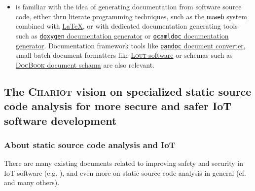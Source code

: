 \begin{itemize}
      \item is familiar with the idea of generating documentation from
        software source code, either thru
        \href{https://en.wikipedia.org/wiki/Literate_programming}{literate
          programming} techniques, such as the
           
        \href{http://nuweb.sourceforge.net/}{\texttt{nuweb} system}
        combined with \href{https://www.latex-project.org/}{\LaTeX},
        or with dedicated documentation generating tools such as
        \href{https://www.doxygen.nl/}{\texttt{doxygen} documentation
          generator} or
        \href{https://caml.inria.fr/pub/docs/manual-ocaml/ocamldoc.html}{\texttt{ocamldoc}
          documentation generator}. Documentation framework tools like
        \href{https://pandoc.org/}{\texttt{pandoc} document converter}, small batch document formatters like \href{https://en.wikipedia.org/wiki/Lout_(software)}{\textsc{Lout} software}
        or schemas such as
        \href{https://docbook.org/}{\textsc{DocBook} document schama}
        are also relevant.
      
\end{itemize}


\bigskip



\subsection{The \textsc{Chariot} vision on specialized static source code analysis for more secure and safer IoT software development}
\label{subsec:chariotvision}

\subsubsection{About static source code analysis and IoT}

  There are many
existing documents related to improving safety and security in IoT
software (e.g. \cite{Chen:2011:DAS, Medwed:2016:ISC,
  KUMAR:2019:cloud-security, Chakkaravarthy:2019:malware-analysis}),
and even more on static source code analysis in general
(cf. \cite{Gomes2009AnOO, GosevaPopstojanova2015OnTC,
  Binkley:2007:SCA} and many others). %

